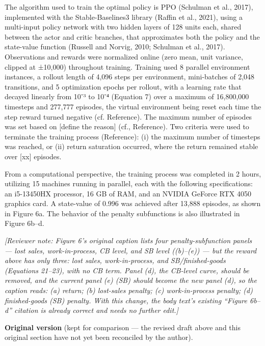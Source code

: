 The algorithm used to train the optimal policy is PPO (Schulman et al.,
2017), implemented with the Stable-Baselines3 library (Raffin et al.,
2021), using a multi-input policy network with two hidden layers of 128
units each, shared between the actor and critic branches, that
approximates both the policy and the state-value function (Russell and
Norvig, 2010; Schulman et al., 2017). Observations and rewards were
normalized online (zero mean, unit variance, clipped at ±10,000)
throughout training. Training used 8 parallel environment instances, a
rollout length of 4,096 steps per environment, mini-batches of 2,048
transitions, and 5 optimization epochs per rollout, with a learning rate
that decayed linearly from 10⁻³ to 10⁻⁴ (Equation 7) over a maximum of
16,800,000 timesteps and 277,777 episodes, the virtual environment being
reset each time the step reward turned negative (cf. Reference). The
maximum number of episodes was set based on {[}define the reason{]}
(cf., Reference). Two criteria were used to terminate the training
process (Reference): (i) the maximum number of timesteps was reached, or
(ii) return saturation occurred, where the return remained stable over
{[}xx{]} episodes.

From a computational perspective, the training process was completed in
2 hours, utilizing 15 machines running in parallel, each with the
following specifications: an i5-13450HX processor, 16 GB of RAM, and an
NVIDIA GeForce RTX 4050 graphics card. A state-value of 0.996 was
achieved after 13,888 episodes, as shown in Figure 6a. The behavior of
the penalty subfunctions is also illustrated in Figure 6b--d.

\emph{{[}Reviewer note: Figure 6's original caption lists four
penalty-subfunction panels --- lost sales, work-in-process, CB level,
and SB level ((b)--(e)) --- but the reward above has only three: lost
sales, work-in-process, and SB/finished-goods (Equations 21--23), with
no CB term. Panel (d), the CB-level curve, should be removed, and the
current panel (e) (SB) should become the new panel (d), so the caption
reads: (a) return; (b) lost-sales penalty; (c) work-in-process penalty;
(d) finished-goods (SB) penalty. With this change, the body text's
existing ``Figure 6b--d'' citation is already correct and needs no
further edit.{]}}

\bigskip\noindent\hrulefill\par\smallskip\noindent\textbf{Original version} (kept for comparison --- the revised draft above and this original section have not yet been reconciled by the author).\par\bigskip
